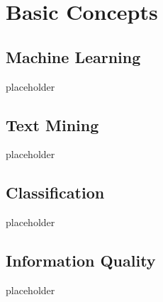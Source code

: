 \section{Basic Concepts}
	\subsection{Machine Learning}
		{\color{red} \Large placeholder}
	\subsection{Text Mining}
		{\color{red} \Large placeholder}
	\subsection{Classification}
		{\color{red} \Large placeholder}
	\subsection{Information Quality}
		{\color{red} \Large placeholder}
